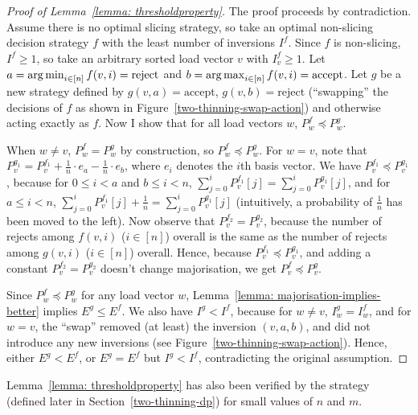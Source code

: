 \begin{proof} [Proof of Lemma~\ref{lemma: thresholdproperty}]
    The proof proceeds by contradiction. Assume there is no optimal slicing strategy, so take an optimal non-slicing decision strategy $f$ with the least number of inversions $I^f$. Since $f$ is non-slicing, $I^f\geq 1$, so take an arbitrary sorted load vector $v$ with $I^f_v\geq 1$. Let $a=\operatorname*{arg\,min}_{i\in [n]} f(v,i)=\mathrm{reject}$ and $b=\operatorname*{arg\,max}_{i\in [n]} f(v,i)=\mathrm{accept}$. Let $g$ be a new strategy defined by $g(v,a)=\mathrm{accept}$, $g(v,b)=\mathrm{reject}$ (``swapping'' the decisions of $f$ as shown in Figure~\ref{two-thinning-swap-action}) and otherwise acting exactly as $f$. Now I show that for all load vectors $w$, $P^f_w\preccurlyeq P^g_w$.
    
    When $w\neq v$, $P^f_w = P^g_w$ by construction, so $P^f_w\preccurlyeq P^g_w$. For $w=v$, note that $P^{g_1}_{v}=P^{f_1}_{v}+\frac{1}{n}\cdot e_a-\frac{1}{n}\cdot e_b$, where $e_i$ denotes the $i$th basis vector. We have $P^{f_1}_{v}\preccurlyeq P^{g_1}_{v}$, because for $0\leq i<a$ and $b\leq i<n$, $\sum_{j=0}^i P^{f_1}_{v}[j] = \sum_{j=0}^i P^{g_1}_{v}[j]$, and for $a\leq i<n$, $\sum_{j=0}^i P^{f_1}_{v}[j] + \frac{1}{n} = \sum_{j=0}^i P^{g_1}_{v}[j]$ (intuitively, a probability of $\frac{1}{n}$ has been moved to the left). Now observe that $P^{f_2}_{v}=P^{g_2}_{v}$, because the number of rejects among $f(v,i)$ ($i\in [n]$) overall is the same as the number of rejects among $g(v,i)$ ($i\in [n]$) overall. Hence, because $P^{f_1}_{v}\preccurlyeq P^{g_1}_{v}$, and adding a constant $P^{f_2}_{v}=P^{g_2}_{v}$ doesn't change majorisation, we get $P^f_v \preccurlyeq P^g_v$.
    
    
    Since $P^f_w\preccurlyeq P^g_w$ for any load vector $w$, Lemma~\ref{lemma: majorisation-implies-better} implies $E^g\leq E^f$. We also have $I^g<I^f$, because for $w\neq v$, $I^g_w=I^f_w$, and for $w=v$, the ``swap'' removed (at least) the inversion $(v,a,b)$, and did not introduce any new inversions (see Figure~\ref{two-thinning-swap-action}). Hence, either $E^g<E^f$, or $E^g=E^f$ but $I^g<I^f$, contradicting the original assumption.
\end{proof}


\begin{remark}
Lemma~\ref{lemma: thresholdproperty} has also been verified by the \DP strategy (defined later in Section~\ref{two-thinning-dp}) for small values of $n$ and $m$.
\end{remark}




